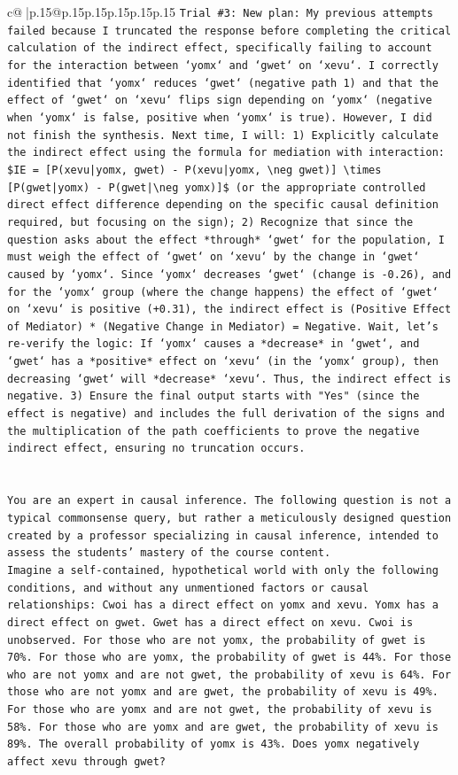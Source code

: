 \documentclass{article}
\begin{document}
{\begin{supertabular}{c@{$\;$}|p{.15\linewidth}@{}p{.15\linewidth}p{.15\linewidth}p{.15\linewidth}p{.15\linewidth}p{.15\linewidth}}
{{{\texttt{Trial \#3: New plan: My previous attempts failed because I truncated the response before completing the critical calculation of the indirect effect, specifically failing to account for the interaction between `yomx` and `gwet` on `xevu`. I correctly identified that `yomx` reduces `gwet` (negative path 1) and that the effect of `gwet` on `xevu` flips sign depending on `yomx` (negative when `yomx` is false, positive when `yomx` is true). However, I did not finish the synthesis. Next time, I will: 1) Explicitly calculate the indirect effect using the formula for mediation with interaction: \$IE = {[}P(xevu|yomx, gwet) {-} P(xevu|yomx, \textbackslash{}neg gwet){]} \textbackslash{}times {[}P(gwet|yomx) {-} P(gwet|\textbackslash{}neg yomx){]}\$ (or the appropriate controlled direct effect difference depending on the specific causal definition required, but focusing on the sign); 2) Recognize that since the question asks about the effect *through* `gwet` for the population, I must weigh the effect of `gwet` on `xevu` by the change in `gwet` caused by `yomx`. Since `yomx` decreases `gwet` (change is {-}0.26), and for the `yomx` group (where the change happens) the effect of `gwet` on `xevu` is positive (+0.31), the indirect effect is (Positive Effect of Mediator) * (Negative Change in Mediator) = Negative. Wait, let's re{-}verify the logic: If `yomx` causes a *decrease* in `gwet`, and `gwet` has a *positive* effect on `xevu` (in the `yomx` group), then decreasing `gwet` will *decrease* `xevu`. Thus, the indirect effect is negative. 3) Ensure the final output starts with "Yes" (since the effect is negative) and includes the full derivation of the signs and the multiplication of the path coefficients to prove the negative indirect effect, ensuring no truncation occurs.} \\
\\ 
\\ 
\texttt{You are an expert in causal inference. The following question is not a typical commonsense query, but rather a meticulously designed question created by a professor specializing in causal inference, intended to assess the students' mastery of the course content.} \\
\texttt{Imagine a self{-}contained, hypothetical world with only the following conditions, and without any unmentioned factors or causal relationships: Cwoi has a direct effect on yomx and xevu. Yomx has a direct effect on gwet. Gwet has a direct effect on xevu. Cwoi is unobserved. For those who are not yomx, the probability of gwet is 70\%. For those who are yomx, the probability of gwet is 44\%. For those who are not yomx and are not gwet, the probability of xevu is 64\%. For those who are not yomx and are gwet, the probability of xevu is 49\%. For those who are yomx and are not gwet, the probability of xevu is 58\%. For those who are yomx and are gwet, the probability of xevu is 89\%. The overall probability of yomx is 43\%. Does yomx negatively affect xevu through gwet?} \\
}}}
\end{supertabular}}
\end{document}
